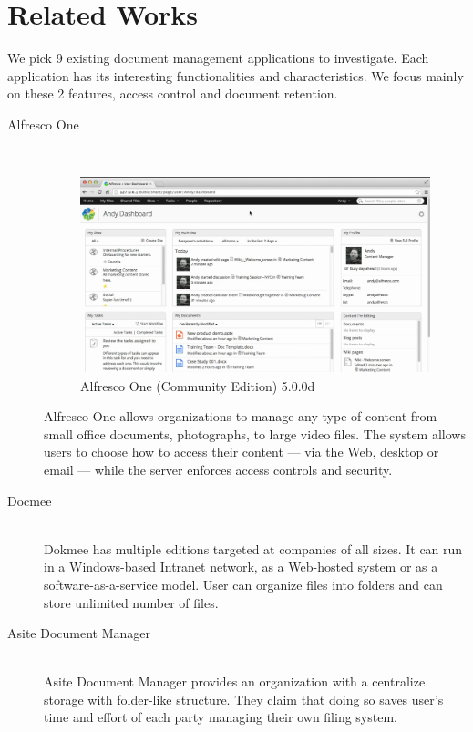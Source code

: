 \section{Related Works} \label{relate-works}
We pick 9 existing document management applications to investigate.
Each application has its interesting functionalities and characteristics.
We focus mainly on these 2 features, access control and document retention.
\begin{description}
\item[Alfresco One] \hfill \\
\begin{figure}[ht]
	\centering
	\includegraphics[scale=0.4]{res/literature/screenshot_alfresco}
	\caption{Alfresco One (Community Edition) 5.0.0d}
\end{figure}
Alfresco One allows organizations to manage any type of content from small office documents, photographs, to large video files.
The system allows users to choose how to access their content --- via the Web, desktop or email --- while the server enforces access controls and security.

\item[Docmee] \hfill \\
Dokmee has multiple editions targeted at companies of all sizes.
It can run in a Windows-based Intranet network, as a Web-hosted system or as a software-as-a-service model.
User can organize files into folders and can store unlimited number of files.

\item[Asite Document Manager] \hfill \\
Asite Document Manager provides an organization with a centralize storage with folder-like structure.
They claim that doing so saves user's time and effort of each party managing their own filing system.


\end{description}
